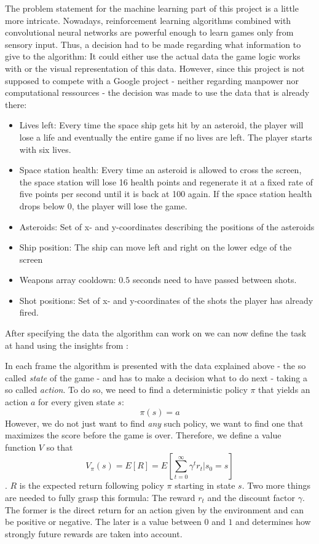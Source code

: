 \documentclass[a4paper,10pt]{article}
\begin{document}
The problem statement for the machine learning part of this project is a little more intricate.
Nowadays, reinforcement learning algorithms combined with convolutional neural networks are powerful enough to learn games only from sensory input\cite{DeepmindBreakout}.
Thus, a decision had to be made regarding what information to give to the algorithm:
It could either use the actual data the game logic works with or the visual representation of this data.
However, since this project is not supposed to compete with a Google project - neither regarding manpower nor computational ressources - the decision was made to use the data that is already there:

\begin{itemize}
 \item Lives left: Every time the space ship gets hit by an asteroid, the player will lose a life and eventually the entire game if no lives are left. The player starts with six lives.
 \item Space station health: Every time an asteroid is allowed to cross the screen, the space station will lose 16 health points and regenerate it at a fixed rate of five points per second until it is back at 100 again. If the space station health drops below $0$, the player will lose the game.
 \item Asteroids: Set of x- and y-coordinates describing the positions of the asteroids
 \item Ship position: The ship can move left and right on the lower edge of the screen
 \item Weapons array cooldown: $0.5$ seconds need to have passed between shots.
 \item Shot positions: Set of x- and y-coordinates of the shots the player has already fired.
\end{itemize}

After specifying the data the algorithm can work on we can now define the task at hand using the insights from \cite{712192}:

In each frame the algorithm is presented with the data explained above - the so called \emph{state} of the game - and has to make a decision what to do next - taking a so called \emph{action}.
To do so, we need to find a deterministic policy $\pi$ that yields an action $a$ for every given state $s$:
\[\pi(s)=a\]
However, we do not just want to find \emph{any} such policy, we want to find one that maximizes the score before the game is over. 
Therefore, we define a value function $V$ so that
\[V_\pi(s) = E[R] = E[\sum_{t=0}^\infty\gamma^tr_t|s_0=s]\].
$R$ is the expected return following policy $\pi$ starting in state $s$.
Two more things are needed to fully grasp this formula: The reward $r_t$ and the discount factor $\gamma$.
The former is the direct return for an action given by the environment and can be positive or negative.
The later is a value between $0$ and $1$ and determines how strongly future rewards are taken into account.
\end{document}
